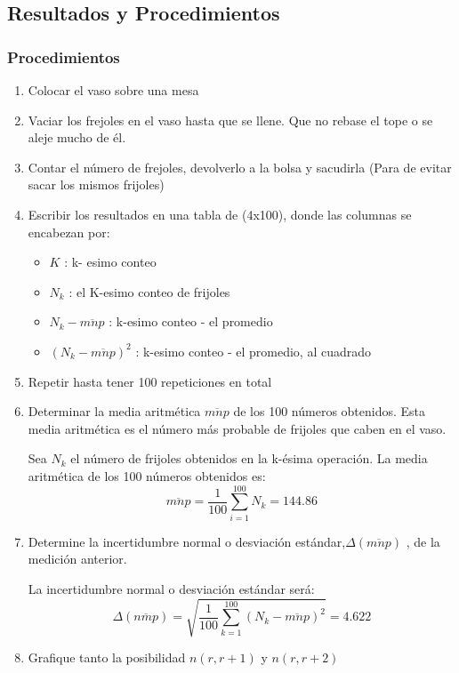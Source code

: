 \documentclass[10pt]{article}
\begin{document}
\subsection{Resultados y Procedimientos}



\subsubsection{Procedimientos}

\begin{enumerate}
    \item Colocar el vaso sobre una mesa
    \item Vaciar los frejoles en el vaso hasta que se llene. Que no rebase el tope o se aleje mucho de él.
    \item Contar el número de frejoles, devolverlo a la bolsa y sacudirla (Para de evitar sacar los mismos frijoles)
    \item Escribir los resultados en una tabla de (4x100), donde las columnas se encabezan por:
    \begin{itemize}
        \item $K$ : k- esimo conteo 
        \item $N_k$ : el K-esimo conteo de frijoles
        \item $N_k - \overline{mnp}$ :  k-esimo conteo - el promedio 
        \item $(N_k - \overline{mnp})^2$ : k-esimo conteo - el promedio, al cuadrado
    \end{itemize}
    \item Repetir hasta tener 100 repeticiones en total
    \item Determinar la media aritmética $\overline{mnp}$ de los 100 números obtenidos. Esta media aritmética es el número más probable de frijoles que caben en el vaso.

    Sea $N_k$ el número de frijoles obtenidos en la k-ésima operación. La media aritmética de los 100 números obtenidos es:
    \begin{equation*}
        \overline{mnp}=\dfrac{1}{100}\sum_{i=1}^{100} N_k = 144.86
    \end{equation*}
    \item Determine la incertidumbre normal o desviación estándar,$\Delta(\overline{mnp})$ , de la medición anterior.

    La incertidumbre normal o desviación estándar será:
    \begin{equation*}
    \Delta(\overline{n m p})=\sqrt{\frac{1}{100} \sum_{k=1}^{100}\left(N_k-\overline{mnp}\right)^2}=4.622
    \end{equation*}
    \item Grafique tanto la posibilidad $n(r,r+1)$ y $n(r,r+2)$

\end{enumerate}
\end{document}
